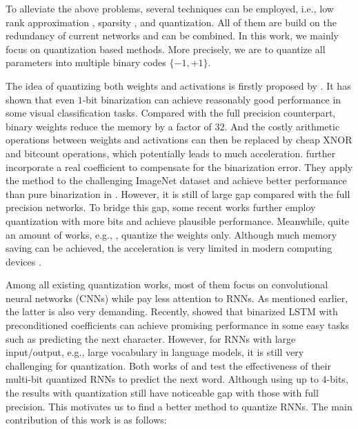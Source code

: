 \documentclass{article} %
\newcommand{\<}{\left\langle}
\renewcommand{\>}{\right\rangle}
\begin{document}
To alleviate the above problems, several techniques can be employed, i.e., low rank approximation \citep{lowrank1,lowrank2,lowrank3,lowrank4}, sparsity \citep{sparse0,sparse1,pruning,sparse2}, and quantization. All of them are build on the redundancy of current networks and can be combined. In this work, we mainly focus on quantization based methods. More precisely, we are to quantize all parameters into multiple binary codes $\{-1,+1\}$.

The idea of quantizing both weights and activations is firstly proposed by \citep{bnn}. It has shown that even $1$-bit binarization can achieve reasonably good performance in some visual classification tasks. Compared with the full precision counterpart, binary weights reduce the memory by a factor of $ 32$.  And the costly arithmetic operations between weights and activations can then be replaced by cheap XNOR and bitcount operations\citep{bnn}, which potentially leads to much acceleration.  \citet{xnor} further incorporate a real coefficient to compensate for the binarization error. They apply the method to the challenging ImageNet dataset and achieve better performance than pure binarization in \citep{bnn}. However, it is still of large gap compared with the full precision networks. To bridge this gap, some recent works \citep{qnn, dorefa, balanced} further employ quantization with more bits and achieve plausible performance. Meanwhile, quite an amount of works, e.g., \citep{binaryconnect,ternary, tternary, refinedgreedy},  quantize the weights only. Although much memory saving can be achieved, the acceleration is very limited in modern computing devices \citep{xnor}. 

Among all existing quantization works, most of them focus on convolutional neural networks (CNNs) while pay less attention to RNNs.  As mentioned earlier, the latter is also very demanding. Recently, \citep{lab} showed that binarized LSTM with preconditioned coefficients can achieve promising performance in some easy tasks such as predicting the next character. However, for RNNs with large input/output, e.g., large vocabulary in language models, it is still very challenging for quantization. Both works of \citet{qnn} and \citet{balanced} test the effectiveness of their multi-bit quantized RNNs to predict the next word.  Although using up to $4$-bits, the results with quantization still have noticeable gap with those with full precision. This motivates us to find a better method to quantize RNNs. The main contribution of this work is as follows:
\end{document}
